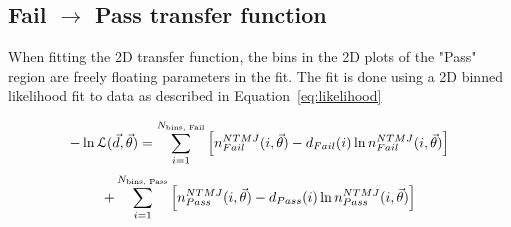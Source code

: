 %
%
%
%
%  
%
%
%
%
%
%  





\subsection{Fail $\rightarrow$ Pass transfer function}

When fitting the 2D transfer function, the bins in the 2D plots of the "Pass" region are freely floating parameters in the fit. The fit is done using a 2D binned likelihood fit to data as described in Equation~\ref{eq:likelihood}~\cite{CMS:2021iuw_2dalphabet}


\begin{equation}
	\centering
	- \ln \mathcal{L} (\vec{d}, \vec{\theta}) = \sum^{N_{\text{bins, Fail}}}_{i=1} \left[ n^{NTMJ}_{Fail}(i,\vec{\theta}) - d_{Fail}(i) \ln n^{NTMJ}_{Fail}(i,\vec{\theta}) \right]   \nonumber
\end{equation}
\begin{equation}
	\centering
	+\sum^{N_{\text{bins, Pass}}}_{i=1} \left[ n^{NTMJ}_{Pass}(i,\vec{\theta}) - d_{Pass}(i)   \ln n^{NTMJ}_{Pass}(i,\vec{\theta}) \right]
\label{eq:likelihood}
\end{equation}


